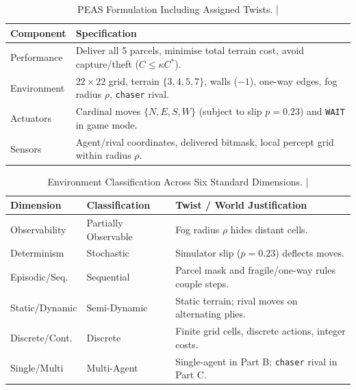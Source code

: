 \documentclass[conference]{IEEEtran}
\begin{document}
\begin{table}[t]
    \centering
    \caption{PEAS Formulation Including Assigned Twists. | \stampline}
    \label{tab:peas}
    \scriptsize
    \begin{tabular}{@{}p{1.6cm}p{6.5cm}@{}}
        \toprule
        \textbf{Component} & \textbf{Specification} \\
        \midrule
        Performance & Deliver all 5 parcels, minimise total terrain cost, avoid capture/theft ($C \le \kappa C^*$). \\
        Environment & $22\times 22$ grid, terrain $\{3,4,5,7\}$, walls ($-1$), one-way edges, fog radius $\rho$, \texttt{chaser} rival. \\
        Actuators & Cardinal moves $\{N, E, S, W\}$ (subject to slip $p=0.23$) and \texttt{WAIT} in game mode. \\
        Sensors & Agent/rival coordinates, delivered bitmask, local percept grid within radius $\rho$. \\
        \bottomrule
    \end{tabular}
\end{table}

\begin{table}[t]
    \centering
    \caption{Environment Classification Across Six Standard Dimensions. | \stampline}
    \label{tab:env_class}
    \scriptsize
    \begin{tabular}{@{}p{2.1cm}p{2.0cm}p{3.8cm}@{}}
        \toprule
        \textbf{Dimension} & \textbf{Classification} & \textbf{Twist / World Justification} \\
        \midrule
        Observability & Partially Observable & Fog radius $\rho$ hides distant cells. \\
        Determinism & Stochastic & Simulator slip ($p=0.23$) deflects moves. \\
        Episodic/Seq. & Sequential & Parcel mask and fragile/one-way rules couple steps. \\
        Static/Dynamic & Semi-Dynamic & Static terrain; rival moves on alternating plies. \\
        Discrete/Cont. & Discrete & Finite grid cells, discrete actions, integer costs. \\
        Single/Multi & Multi-Agent & Single-agent in Part B; \texttt{chaser} rival in Part C. \\
        \bottomrule
    \end{tabular}
\end{table}
\end{document}
